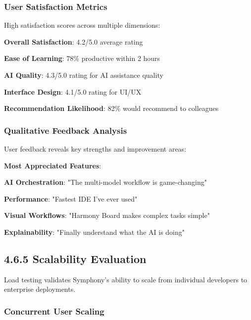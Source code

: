 \subsubsection*{User Satisfaction Metrics}

High satisfaction scores across multiple dimensions:

\begin{compactlist}
    \item \textbf{Overall Satisfaction}: 4.2/5.0 average rating
    \item \textbf{Ease of Learning}: 78\% productive within 2 hours
    \item \textbf{AI Quality}: 4.3/5.0 rating for AI assistance quality
    \item \textbf{Interface Design}: 4.1/5.0 rating for UI/UX
    \item \textbf{Recommendation Likelihood}: 82\% would recommend to colleagues
\end{compactlist}

\subsubsection*{Qualitative Feedback Analysis}

User feedback reveals key strengths and improvement areas:

\begin{successbox}
\textbf{Most Appreciated Features}:
\begin{compactlist}
    \item \textbf{AI Orchestration}: "The multi-model workflow is game-changing"
    \item \textbf{Performance}: "Fastest IDE I've ever used"
    \item \textbf{Visual Workflows}: "Harmony Board makes complex tasks simple"
    \item \textbf{Explainability}: "Finally understand what the AI is doing"
\end{compactlist}
\end{successbox}

\subsection*{4.6.5 Scalability Evaluation}
\label{subsec:scalability-evaluation}

Load testing validates Symphony's ability to scale from individual developers to enterprise deployments.

\subsubsection*{Concurrent User Scaling}

